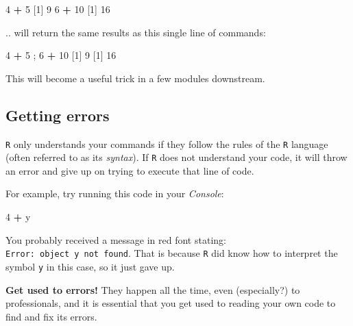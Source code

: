 \documentclass[
]{book}
\newenvironment{Shaded}{\begin{snugshade}}{\end{snugshade}}
\newcommand{\DecValTok}[1]{\textcolor[rgb]{0.00,0.00,0.81}{#1}}
\newcommand{\NormalTok}[1]{#1}
\newcommand{\OperatorTok}[1]{\textcolor[rgb]{0.81,0.36,0.00}{\textbf{#1}}}
\newcommand{\StringTok}[1]{\textcolor[rgb]{0.31,0.60,0.02}{#1}}
\begin{document}
\begin{Shaded}
\begin{Highlighting}[]
\DecValTok{4} \OperatorTok{+}\StringTok{ }\DecValTok{5}
\NormalTok{[}\DecValTok{1}\NormalTok{] }\DecValTok{9}
\DecValTok{6} \OperatorTok{+}\StringTok{ }\DecValTok{10}
\NormalTok{[}\DecValTok{1}\NormalTok{] }\DecValTok{16}
\end{Highlighting}
\end{Shaded}

.. will return the same results as this single line of commands:

\begin{Shaded}
\begin{Highlighting}[]
\DecValTok{4} \OperatorTok{+}\StringTok{ }\DecValTok{5}\NormalTok{ ; }\DecValTok{6} \OperatorTok{+}\StringTok{ }\DecValTok{10}
\NormalTok{[}\DecValTok{1}\NormalTok{] }\DecValTok{9}
\NormalTok{[}\DecValTok{1}\NormalTok{] }\DecValTok{16}
\end{Highlighting}
\end{Shaded}

This will become a useful trick in a few modules downstream.

\hypertarget{getting-errors}{%
\subsection*{Getting errors}\label{getting-errors}}

\texttt{R} only understands your commands if they follow the rules of the \texttt{R} language (often referred to as its \emph{syntax}). If \texttt{R} does not understand your code, it will throw an error and give up on trying to execute that line of code.

For example, try running this code in your \emph{Console}:

\begin{Shaded}
\begin{Highlighting}[]
\DecValTok{4} \OperatorTok{+}\StringTok{ }\NormalTok{y}
\end{Highlighting}
\end{Shaded}

You probably received a message in red font stating: \texttt{Error:\ object\ \textquotesingle{}y\textquotesingle{}\ not\ found}. That is because \texttt{R} did know how to interpret the symbol \texttt{y} in this case, so it just gave up.

\textbf{Get used to errors!} They happen all the time, even (especially?) to professionals, and it is essential that you get used to reading your own code to find and fix its errors.
\end{document}
